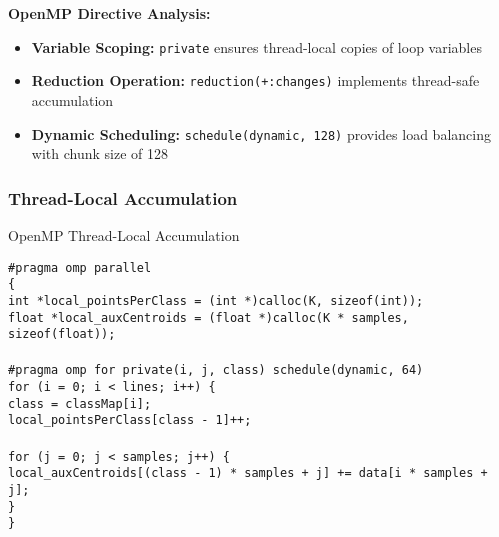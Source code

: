 \documentclass[12pt,a4paper]{article}
\begin{document}
\textbf{OpenMP Directive Analysis:}
\begin{itemize}
\item \textbf{Variable Scoping:} \texttt{private} ensures thread-local copies of loop variables
\item \textbf{Reduction Operation:} \texttt{reduction(+:changes)} implements thread-safe accumulation
\item \textbf{Dynamic Scheduling:} \texttt{schedule(dynamic, 128)} provides load balancing with chunk size of 128
\end{itemize}

\subsubsection{Thread-Local Accumulation}

\begin{algorithm}[H]
\caption{OpenMP Thread-Local Accumulation}
\label{alg:omp_accumulation}
\begin{flushleft}
\texttt{\#pragma omp parallel}\\
\texttt{\{}\\
\hspace{1cm}\texttt{int *local\_pointsPerClass = (int *)calloc(K, sizeof(int));}\\
\hspace{1cm}\texttt{float *local\_auxCentroids = (float *)calloc(K * samples, sizeof(float));}\\
\\
\hspace{1cm}\texttt{\#pragma omp for private(i, j, class) schedule(dynamic, 64)}\\
\hspace{1cm}\texttt{for (i = 0; i < lines; i++) \{}\\
\hspace{2cm}\texttt{class = classMap[i];}\\
\hspace{2cm}\texttt{local\_pointsPerClass[class - 1]++;}\\
\\
\hspace{2cm}\texttt{for (j = 0; j < samples; j++) \{}\\
\hspace{3cm}\texttt{local\_auxCentroids[(class - 1) * samples + j] += data[i * samples + j];}\\
\hspace{2cm}\texttt{\}}\\
\hspace{1cm}\texttt{\}}\\

\end{flushleft}
\end{algorithm}
\end{document}
